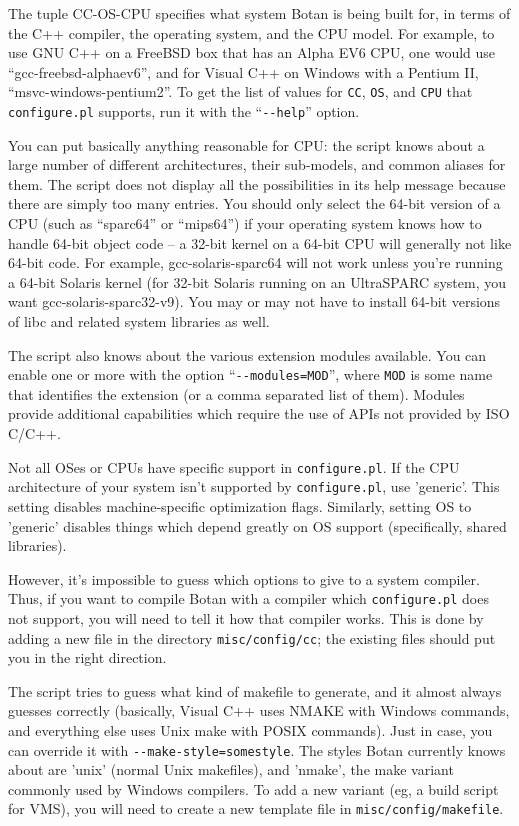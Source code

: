 \documentclass{article}
\newcommand{\filename}[1]{\texttt{#1}}
\begin{document}
The tuple CC-OS-CPU specifies what system Botan is being built for, in terms of
the C++ compiler, the operating system, and the CPU model. For example, to use
GNU C++ on a FreeBSD box that has an Alpha EV6 CPU, one would use
``gcc-freebsd-alphaev6'', and for Visual C++ on Windows with a Pentium II,
``msvc-windows-pentium2''. To get the list of values for \verb|CC|, \verb|OS|,
and \verb|CPU| that \filename{configure.pl} supports, run it with the
``\verb|--help|'' option.

You can put basically anything reasonable for CPU: the script knows
about a large number of different architectures, their sub-models, and
common aliases for them. The script does not display all the
possibilities in its help message because there are simply too many
entries. You should only select the 64-bit version of a CPU (such as
``sparc64'' or ``mips64'') if your operating system knows how to
handle 64-bit object code -- a 32-bit kernel on a 64-bit CPU will
generally not like 64-bit code. For example, gcc-solaris-sparc64 will
not work unless you're running a 64-bit Solaris kernel (for 32-bit
Solaris running on an UltraSPARC system, you want
gcc-solaris-sparc32-v9). You may or may not have to install 64-bit
versions of libc and related system libraries as well.

The script also knows about the various extension modules
available. You can enable one or more with the option
``\verb|--modules=MOD|'', where \verb|MOD| is some name that
identifies the extension (or a comma separated list of them). Modules
provide additional capabilities which require the use of APIs not
provided by ISO C/C++.

Not all OSes or CPUs have specific support in \filename{configure.pl}. If the
CPU architecture of your system isn't supported by \filename{configure.pl}, use
'generic'. This setting disables machine-specific optimization
flags. Similarly, setting OS to 'generic' disables things which depend greatly
on OS support (specifically, shared libraries).

However, it's impossible to guess which options to give to a system
compiler.  Thus, if you want to compile Botan with a compiler which
\filename{configure.pl} does not support, you will need to tell it how
that compiler works. This is done by adding a new file in the
directory \filename{misc/config/cc}; the existing files should put you
in the right direction.

The script tries to guess what kind of makefile to generate, and it
almost always guesses correctly (basically, Visual C++ uses NMAKE with
Windows commands, and everything else uses Unix make with POSIX
commands). Just in case, you can override it with
\verb|--make-style=somestyle|. The styles Botan currently knows about
are 'unix' (normal Unix makefiles), and 'nmake', the make variant
commonly used by Windows compilers. To add a new variant (eg, a build
script for VMS), you will need to create a new template file in
\filename{misc/config/makefile}.
\end{document}
